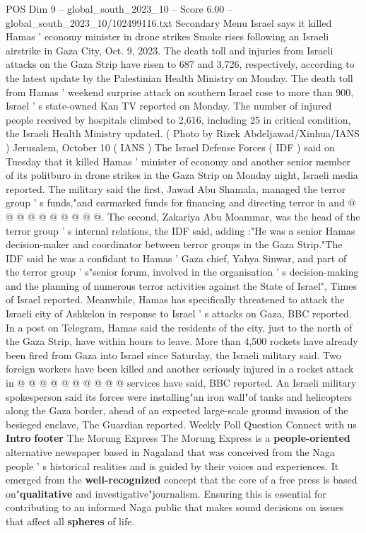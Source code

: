 \begin{textsample}{POS Dim 9 – global\_south\_2023\_10 – Score 6.00 – global\_south\_2023\_10/102499116.txt}  \label{ex:f9_pos_038}
Secondary Menu Israel says it killed Hamas ' economy minister in drone strikes Smoke rises following an Israeli airstrike in Gaza City, Oct. 9, 2023.
The death toll and injuries from Israeli attacks on the Gaza Strip have risen to 687 and 3,726, respectively, according to the latest update by the Palestinian Health Ministry on Monday.
The death toll from Hamas ' weekend surprise attack on southern Israel rose to more than 900, Israel ' s state-owned Kan TV reported on Monday.
The number of injured people received by hospitals climbed to 2,616, including 25 in critical condition, the Israeli Health Ministry updated. ( Photo by Rizek Abdeljawad/Xinhua/IANS ) Jerusalem, October 10 ( IANS ) The Israel Defense Forces ( IDF ) said on Tuesday that it killed Hamas ' minister of economy and another senior member of its politburo in drone strikes in the Gaza Strip on Monday night, Israeli media reported.
The military said the first, Jawad Abu Shamala, managed the terror group ' s funds,"and earmarked funds for financing and directing terror in and @ @ @ @ @ @ @ @ @ @.
The second, Zakariya Abu Moammar, was the head of the terror group ' s internal relations, the IDF said, adding :"He was a senior Hamas decision-maker and coordinator between terror groups in the Gaza Strip."The IDF said he was a confidant to Hamas ' Gaza chief, Yahya Sinwar, and part of the terror group ' s"senior forum, involved in the organisation ' s decision-making and the planning of numerous terror activities against the State of Israel", Times of Israel reported.
Meanwhile, Hamas has specifically threatened to attack the Israeli city of Ashkelon in response to Israel ' s attacks on Gaza, BBC reported.
In a post on Telegram, Hamas said the residents of the city, just to the north of the Gaza Strip, have within hours to leave.
More than 4,500 rockets have already been fired from Gaza into Israel since Saturday, the Israeli military said.
Two foreign workers have been killed and another seriously injured in a rocket attack in @ @ @ @ @ @ @ @ @ @ services have said, BBC reported.
An Israeli military spokesperson said its forces were installing"an iron wall"of tanks and helicopters along the Gaza border, ahead of an expected large-scale ground invasion of the besieged enclave, The Guardian reported.
Weekly Poll Question Connect with us \textbf{Intro} \textbf{footer} The Morung Express The Morung Express is a \textbf{people-oriented} alternative newspaper based in Nagaland that was conceived from the Naga people ' s historical realities and is guided by their voices and experiences.
It emerged from the \textbf{well-recognized} concept that the core of a free press is based on"\textbf{qualitative} and investigative"journalism.
Ensuring this is essential for contributing to an informed Naga public that makes sound decisions on issues that affect all \textbf{spheres} of life.

\end{textsample}
